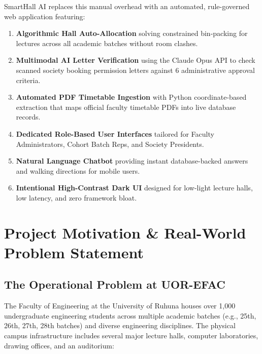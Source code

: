 \documentclass[11pt,a4paper]{article}
\begin{document}
SmartHall AI replaces this manual overhead with an automated, rule-governed web application featuring:
\begin{enumerate}
    \item \textbf{Algorithmic Hall Auto-Allocation} solving constrained bin-packing for lectures across all academic batches without room clashes.
    \item \textbf{Multimodal AI Letter Verification} using the Claude Opus API to check scanned society booking permission letters against 6 administrative approval criteria.
    \item \textbf{Automated PDF Timetable Ingestion} with Python coordinate-based extraction that maps official faculty timetable PDFs into live database records.
    \item \textbf{Dedicated Role-Based User Interfaces} tailored for Faculty Administrators, Cohort Batch Reps, and Society Presidents.
    \item \textbf{Natural Language Chatbot} providing instant database-backed answers and walking directions for mobile users.
    \item \textbf{Intentional High-Contrast Dark UI} designed for low-light lecture halls, low latency, and zero framework bloat.
\end{enumerate}

\newpage
\tableofcontents
\newpage

\section{Project Motivation \& Real-World Problem Statement}

\subsection{The Operational Problem at UOR-EFAC}
The Faculty of Engineering at the University of Ruhuna houses over 1,000 undergraduate engineering students across multiple academic batches (e.g., 25th, 26th, 27th, 28th batches) and diverse engineering disciplines. The physical campus infrastructure includes several major lecture halls, computer laboratories, drawing offices, and an auditorium:
\end{document}
